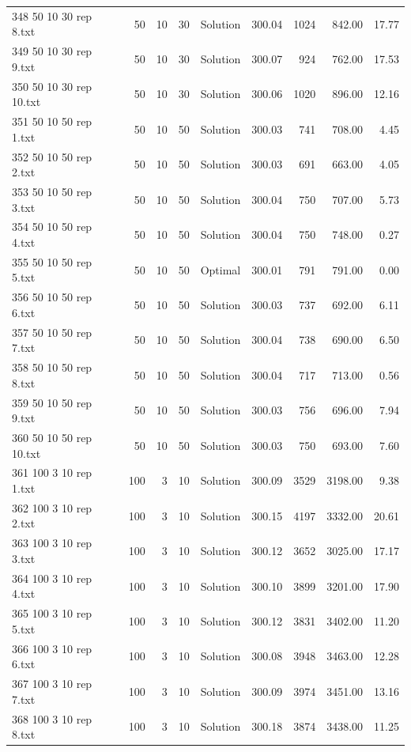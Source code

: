 \begin{longtable}{lrrllrrrr}
348 50 10 30 rep 8.txt & 50 & 10 & 30 & Solution & 300.04 & 1024 & 842.00 & 17.77\\
349 50 10 30 rep 9.txt & 50 & 10 & 30 & Solution & 300.07 & 924 & 762.00 & 17.53\\
350 50 10 30 rep 10.txt & 50 & 10 & 30 & Solution & 300.06 & 1020 & 896.00 & 12.16\\
351 50 10 50 rep 1.txt & 50 & 10 & 50 & Solution & 300.03 & 741 & 708.00 &  4.45\\
352 50 10 50 rep 2.txt & 50 & 10 & 50 & Solution & 300.03 & 691 & 663.00 &  4.05\\
353 50 10 50 rep 3.txt & 50 & 10 & 50 & Solution & 300.04 & 750 & 707.00 &  5.73\\
354 50 10 50 rep 4.txt & 50 & 10 & 50 & Solution & 300.04 & 750 & 748.00 &  0.27\\
355 50 10 50 rep 5.txt & 50 & 10 & 50 & Optimal & 300.01 & 791 & 791.00 &  0.00\\
356 50 10 50 rep 6.txt & 50 & 10 & 50 & Solution & 300.03 & 737 & 692.00 &  6.11\\
357 50 10 50 rep 7.txt & 50 & 10 & 50 & Solution & 300.04 & 738 & 690.00 &  6.50\\
358 50 10 50 rep 8.txt & 50 & 10 & 50 & Solution & 300.04 & 717 & 713.00 &  0.56\\
359 50 10 50 rep 9.txt & 50 & 10 & 50 & Solution & 300.03 & 756 & 696.00 &  7.94\\
360 50 10 50 rep 10.txt & 50 & 10 & 50 & Solution & 300.03 & 750 & 693.00 &  7.60\\
361 100 3 10 rep 1.txt & 100 & 3 & 10 & Solution & 300.09 & 3529 & 3198.00 &  9.38\\
362 100 3 10 rep 2.txt & 100 & 3 & 10 & Solution & 300.15 & 4197 & 3332.00 & 20.61\\
363 100 3 10 rep 3.txt & 100 & 3 & 10 & Solution & 300.12 & 3652 & 3025.00 & 17.17\\
364 100 3 10 rep 4.txt & 100 & 3 & 10 & Solution & 300.10 & 3899 & 3201.00 & 17.90\\
365 100 3 10 rep 5.txt & 100 & 3 & 10 & Solution & 300.12 & 3831 & 3402.00 & 11.20\\
366 100 3 10 rep 6.txt & 100 & 3 & 10 & Solution & 300.08 & 3948 & 3463.00 & 12.28\\
367 100 3 10 rep 7.txt & 100 & 3 & 10 & Solution & 300.09 & 3974 & 3451.00 & 13.16\\
368 100 3 10 rep 8.txt & 100 & 3 & 10 & Solution & 300.18 & 3874 & 3438.00 & 11.25\\

\end{longtable}
